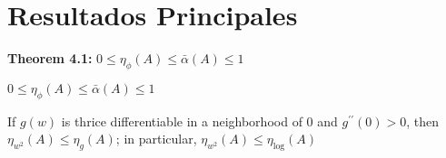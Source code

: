 \section{Resultados Principales}
\textbf{Theorem 4.1:} $0 \leq \eta_{\phi}(A) \leq \bar{\alpha}(A) \leq 1$
\begin{theorem*}[4.1]
    $0 \leq \eta_{\phi}(A) \leq \bar{\alpha}(A) \leq 1$
\end{theorem*}
\begin{theorem*}[5.4]
    If $g(w)$ is thrice differentiable in a neighborhood of $0$ and $g^{\prime\prime} (0) > 0$, then $\eta_{w^2}(A) \leq \eta_g(A)$; in particular, $\eta_{w^2}(A) \leq \eta_{\operatorname{log}}(A)$
\end{theorem*}
